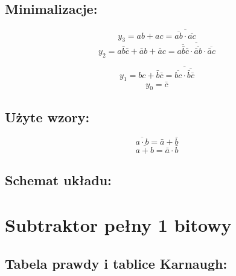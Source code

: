 \documentclass[12pt,a4paper]{article}
\begin{document}
		\subsection{Minimalizacje:}
			
			\begin{minipage}{.5\textwidth}
				\begin{displaymath}
				y_3 = ab + ac = \overline{\overline{ab}\cdot\overline{ac}}
				\end{displaymath}
				\begin{displaymath}
				y_2 = a\bar{b}\bar{c} + \bar{a}b + \bar{a}c
				= \overline{\overline{a\bar{b}\bar{c}}\cdot\overline{\bar{a}b}\cdot\overline{\bar{a}c}}
				\end{displaymath}
			\end{minipage}%
			\begin{minipage}{.5\textwidth}
				\begin{displaymath}
				y_1 = bc + \bar{b}\bar{c}
				= \overline{\overline{bc}\cdot\overline{\bar{b}\bar{c}}}
				\end{displaymath}
				\begin{displaymath}
				y_0 = \bar{c}
				\end{displaymath}
			\end{minipage}
			
		\subsection{Użyte wzory:}
			\begin{equation}
			\overline{a\cdot b}=\bar{a}+\bar{b}
			\end{equation}
			\begin{equation}
			\overline{a+b}=\bar{a}\cdot\bar{b}
			\end{equation}
			
		\subsection{Schemat układu:}
		
		
	\section{Subtraktor pełny 1 bitowy}
		
		\subsection{Tabela prawdy i tablice Karnaugh:}
			
\end{document}
